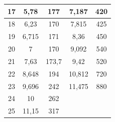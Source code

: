 \documentclass[a4paper, 12pt]{article}
\begin{document}
\begin{table}[h!]
\begin{center}
\begin{tabular}{|c|c|c|c|c|}
17                & 5,78        & 177          & 7,187       & 420          \\ \hline
18                & 6,23        & 170          & 7,815       & 425          \\ \hline
19                & 6,715       & 171          & 8,36        & 450          \\ \hline
20                & 7           & 170          & 9,092       & 540          \\ \hline
21                & 7,63        & 173,7        & 9,42        & 520          \\ \hline
22                & 8,648       & 194          & 10,812      & 720          \\ \hline
23                & 9,696       & 242          & 11,475      & 880          \\ \hline
24                & 10          & 262          &             &              \\ \hline
25                & 11,15       & 317          &             &              \\ \hline
\end{tabular}
\end{center}
\end{table}
\end{document}
